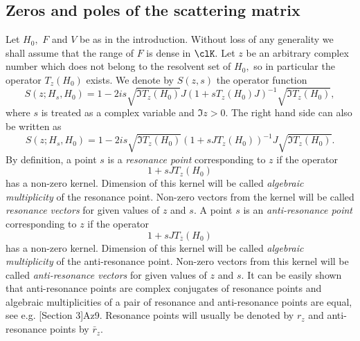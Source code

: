 \documentclass[11pt]{amsart}
\numberwithin{equation}{section}
\begin{document}
\subsection{Zeros and poles of the scattering matrix}
Let $H_0,$ $F$ and $V$ be as in the introduction.
Without loss of any generality we shall assume that the range of $F$ is dense in $\clK.$
Let $z$ be an arbitrary complex number which does not belong to the resolvent set of $H_0,$
so in particular the operator $T_z(H_0)$ exists.
We denote by $S(z,s)$ the operator function
\begin{equation} \label{F: S(s,z)=I formula}
  S(z; H_s,H_0) = 1 - 2i s \sqrt{\Im T_{z}(H_0)} J (1+sT_{z}(H_0)J)^{-1}\sqrt{\Im T_{z}(H_0)},
\end{equation}
where $s$ is treated as a complex variable and $\Im z > 0.$
The right hand side can also be written as
\begin{equation} \label{F: S(s,z)=II formula}
  S(z; H_s,H_0) = 1 - 2i s \sqrt{\Im T_{z}(H_0)} (1+sJT_{z}(H_0))^{-1} J \sqrt{\Im T_{z}(H_0)}.
\end{equation}
By definition, a point $s$ is a \emph{resonance point}
corresponding to $z$ if the operator
$$
  1+sJT_z(H_0)
$$
has a non-zero kernel. Dimension of this kernel will be called \emph{algebraic multiplicity} of the resonance point.
Non-zero vectors from the kernel will be called \emph{resonance vectors} for given values of $z$ and $s.$
A point $s$ is an \emph{anti-resonance point} corresponding to $z$ if the operator
$$
  1+sJT_{\bar z}(H_0)
$$
has a non-zero kernel. Dimension of this kernel will be called \emph{algebraic multiplicity} of the anti-resonance point.
Non-zero vectors from this kernel will be called \emph{anti-resonance vectors} for given values of $z$ and $s.$
It can be easily shown that anti-resonance points are complex conjugates of resonance points and algebraic multiplicities of a pair of resonance and anti-resonance points are equal,
see e.g. {\futurelet\NChar\CleverCite}[Section 3]{Az9}.
Resonance points will usually be denoted by $r_z$ and anti-resonance points by $\bar r_z.$
\end{document}
